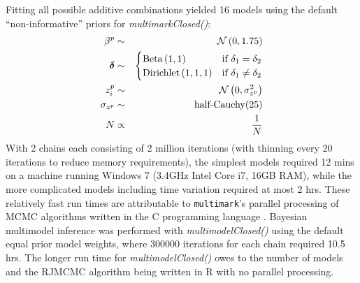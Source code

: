 \documentclass[12pt]{article}
\begin{document}
Fitting all possible additive combinations yielded 16 models using the default ``non-informative'' priors for \textit{multimarkClosed()}:
\begin{eqnarray*}
  \beta^p & \sim & {\cal N} \left( 0, 1.75 \right) \\
  \boldsymbol{\delta} & \sim & \begin{cases}
                                  \text{Beta} \left( 1, 1 \right) & \text{if } \delta_1 = \delta_2 \\
                                  \text{Dirichlet} \left( 1, 1, 1 \right) & \text{if } \delta_1 \ne \delta_2
                               \end{cases} \\
  z^p_i & \sim & {\cal N} \left( 0, \sigma^2_{z^p} \right) \\
  \sigma_{z^p} & \sim & \text{half-Cauchy}(25)\\
  N & \propto & \frac{1}{N}
\end{eqnarray*}
With 2 chains each consisting of 2 million iterations (with thinning every 20 iterations to reduce memory requirements), the simplest models required 12 mins on a machine running Windows 7 (3.4GHz Intel Core i7, 16GB RAM), while the more complicated models including time variation required at most 2 hrs. These relatively fast run times are attributable to \verb|multimark|'s parallel processing of MCMC algorithms written in the C programming language \citep{KernighanRitchie1988}. Bayesian multimodel inference was performed with \textit{multimodelClosed()} using the default equal prior model weights, where 300000 iterations for each chain required 10.5 hrs. The longer run time for \textit{multimodelClosed()} owes to the number of models and the RJMCMC algorithm being written in R with no parallel processing.
\end{document}
